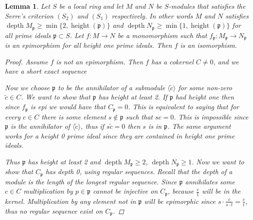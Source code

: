 \documentclass[11pt, a4paper, english]{article}
\newtheorem{lemma}[theorem]{Lemma}
\theoremstyle{definition}
\DeclareMathOperator{\depth}{depth}
\DeclareMathOperator{\height}{height}
\begin{document}
\begin{lemma}
\label{lem:height_one_iso}
Let $S$ be a local ring and let $M$ and $N$ be $S$-modules that satisfies the Serre's criterion $(S_2)$ and $(S_1)$ respectively. In other words $M$ and $N$ satisfies $\depth M_\mathfrak{p} \geq \min \{ 2, \height(\mathfrak{p}) \}$ and $\depth N_\mathfrak{p} \geq \min \{ 1, \height(\mathfrak{p}) \}$ for all prime ideals $\mathfrak{p} \subset S$. Let $f: M \to N$ be a monomorphism such that $f_\mathfrak{p}: M_\mathfrak{p} \to N_\mathfrak{p}$ is an epimorphism for all height one prime ideals. Then $f$ is an isomorphism.
\begin{proof}
Assume $f$ is not an epimorphism. Then $f$ has a cokernel $C \neq 0$, and we have a short exact sequence
\begin{center}
\end{center}
Now we choose $\mathfrak{p}$ to be the annihilator of a submodule $\langle \tilde{c} \rangle$ for some non-zero $\tilde{c} \in C$. We want to show that $\mathfrak{p}$ has height at least 2. If $\mathfrak{p}$ had height one then since $f_\mathfrak{p}$ is epi we would have that $C_\mathfrak{p} = 0$. This is equivalent to saying that for every $c \in C$ there is some element $s \not\in \mathfrak{p}$ such that $sc = 0$. This is impossible since $\mathfrak{p}$ is the annihilator of $\langle \tilde{c} \rangle$, thus if $s\tilde{c}=0$ then $s$ is in $\mathfrak{p}$. The same argument works for a height 0 prime ideal since they are contained in height one prime ideals.

Thus $\mathfrak{p}$ has height at least 2 and $\depth M_\mathfrak{p} \geq 2$, $\depth N_\mathfrak{p} \geq 1$. Now we want to show that $C_\mathfrak{p}$ has depth 0, using regular sequences. Recall that the depth of a module is the length of the longest regular sequence. Since $\mathfrak{p}$ annihilates some $c \in C$ multiplication by $p \in \mathfrak{p}$ cannot be injective on $C_\mathfrak{p}$, because $\frac{c}{1}$ will be in the kernel. Multiplication by any element not in $\mathfrak{p}$ will be epimorphic since $s \cdot \frac{c}{s \cdot t} = \frac{c}{t}$, thus no regular sequence exist on $C_\mathfrak{p}$.


\end{proof}
\end{lemma}
\end{document}
